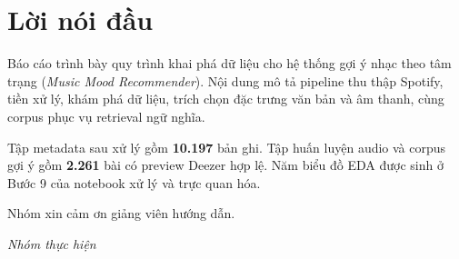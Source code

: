 \chapter*{Lời nói đầu}

Báo cáo trình bày quy trình khai phá dữ liệu cho hệ thống gợi ý nhạc theo tâm trạng (\textit{Music Mood Recommender}). Nội dung mô tả pipeline thu thập Spotify, tiền xử lý, khám phá dữ liệu, trích chọn đặc trưng văn bản và âm thanh, cùng corpus phục vụ retrieval ngữ nghĩa.

Tập metadata sau xử lý gồm \textbf{10.197} bản ghi. Tập huấn luyện audio và corpus gợi ý gồm \textbf{2.261} bài có preview Deezer hợp lệ. Năm biểu đồ EDA được sinh ở Bước 9 của notebook xử lý và trực quan hóa.

Nhóm xin cảm ơn giảng viên hướng dẫn.

\vspace{1em}
\begin{flushright}
  \textit{Nhóm thực hiện}
\end{flushright}
